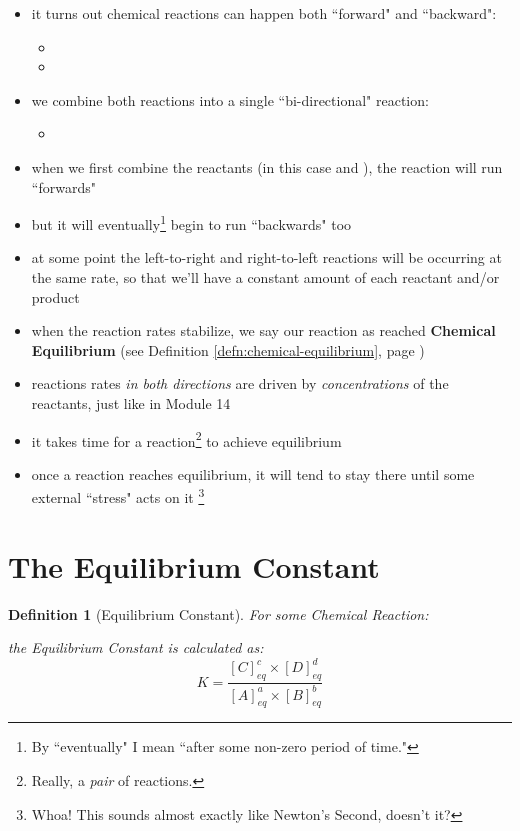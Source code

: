 \documentclass[11pt, oneside]{article}   	%
\newtheorem{definition}{Definition}
\begin{document}
\begin{itemize}
\item it turns out chemical reactions can happen both ``forward" and ``backward":
\begin{itemize}
\item {}
\item {}
\end{itemize}
\item we combine both reactions into a single ``bi-directional" reaction:
\begin{itemize}
\item  {}
\end{itemize}
\item when we first combine the reactants (in this case  and  ), the reaction will run ``forwards"
\item but it will eventually\footnote{By ``eventually" I mean ``after some non-zero period of time."}
begin to run ``backwards" too
\item at some point the left-to-right and right-to-left reactions will be occurring at the same rate, so that we'll have a constant amount of each reactant and/or product
\item when the reaction rates stabilize, we say our reaction as reached \textbf{Chemical Equilibrium} (see Definition \ref{defn:chemical-equilibrium}, page \pageref{defn:chemical-equilibrium}) 
\item reactions rates \emph{in both directions} are driven by \emph{concentrations} of the reactants, just like in Module 14
\item it takes time for a reaction\footnote{Really, a \emph{pair} of reactions.} to achieve equilibrium
\item once a reaction reaches equilibrium, it will tend to stay there until some external ``stress" acts on it
\footnote{Whoa! This sounds almost exactly like Newton's Second, doesn't it?}
\end{itemize}

\section{The Equilibrium Constant}

\begin{definition}[Equilibrium Constant]\label{defn:equilibrium-constant}
For some Chemical Reaction:
 
 \begin{center}
 \end{center}
 
the Equilibrium Constant is calculated as:\\
$$K = \frac{[C]^{c}_{eq} \times [D]^{d}_{eq}} {[A]^{a}_{eq} \times [B]^{b}_{eq}}$$
\end{definition}
\end{document}
